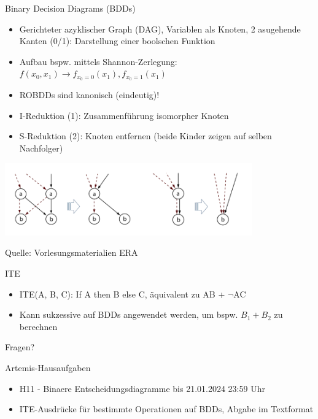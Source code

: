 \documentclass[
  german,            %
  aspectratio=169,    %
]{tumbeamer}
\begin{document}
\begin{frame}[c, fragile]{Binary Decision Diagrams (BDDs)}{}
  \begin{itemize}
    \item Gerichteter azyklischer Graph (DAG), Variablen als Knoten, 2 asugehende Kanten (0/1): Darstellung einer boolschen Funktion
    \item Aufbau bspw. mittels Shannon-Zerlegung: $f(x_0, x_1) \rightarrow f_{x_0=0}(x_1), f_{x_0=1}(x_1)$
    \item ROBDDs sind kanonisch (eindeutig)!
    \item I-Reduktion (1): Zusammenführung isomorpher Knoten
    \item S-Reduktion (2):  Knoten entfernen (beide Kinder zeigen auf selben Nachfolger)
  \end{itemize}
  \begin{center}
    \includegraphics[width=0.8\textwidth]{w11_bdd_reduction.png}
  \end{center}
  \centering
  \tiny{Quelle: Vorlesungsmaterialien ERA}
\end{frame}

\begin{frame}[c, fragile]{ITE}
  \begin{itemize}
    \item ITE(A, B, C): If A then B else C, äquivalent zu AB + $\neg$AC
    \item Kann sukzessive auf BDDs angewendet werden, um bspw. $B_1 + B_2$ zu berechnen
  \end{itemize}
\end{frame}


\begin{frame}[c]{}{}
  \begin{center}
    \LARGE Fragen?
  \end{center}
\end{frame}

\begin{frame}[c, fragile]{Artemis-Hausaufgaben}{}
  \begin{itemize}
    \item H11 - Binaere Entscheidungsdiagramme bis 21.01.2024 23:59 Uhr
    \item ITE-Ausdrücke für bestimmte Operationen auf BDDs, Abgabe im Textformat
  \end{itemize}
\end{frame}
\end{document}
